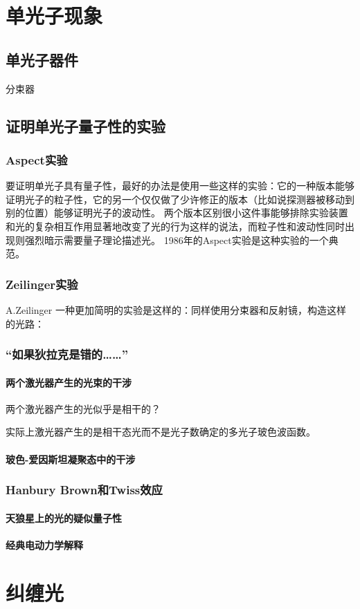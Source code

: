 \chapter{单光子现象}

\section{单光子器件}

分束器

\section{证明单光子量子性的实验}

\subsection{Aspect实验}

要证明单光子具有量子性，最好的办法是使用一些这样的实验：它的一种版本能够证明光子的粒子性，它的另一个仅仅做了少许修正的版本（比如说探测器被移动到别的位置）能够证明光子的波动性。
两个版本区别很小这件事能够排除实验装置和光的复杂相互作用显著地改变了光的行为这样的说法，而粒子性和波动性同时出现则强烈暗示需要量子理论描述光。
1986年的Aspect实验是这种实验的一个典范。

\subsection{Zeilinger实验}

A.Zeilinger
一种更加简明的实验是这样的：同样使用分束器和反射镜，构造这样的光路：

\subsection{“如果狄拉克是错的……”}

\subsubsection{两个激光器产生的光束的干涉}

两个激光器产生的光似乎是相干的？

实际上激光器产生的是相干态光而不是光子数确定的多光子玻色波函数。

\subsubsection{玻色-爱因斯坦凝聚态中的干涉}

\subsection{Hanbury Brown和Twiss效应}

\subsubsection{天狼星上的光的疑似量子性}

\subsubsection{经典电动力学解释}

\chapter{纠缠光}